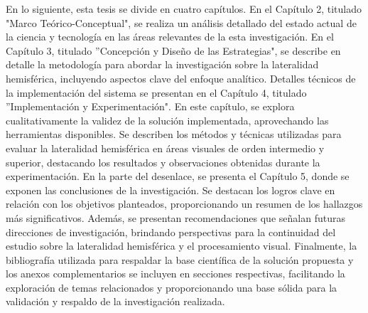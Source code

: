 	En lo siguiente, esta tesis se divide en cuatro capítulos.  En el Capítulo 2, titulado "Marco Teórico-Conceptual", se realiza un análisis detallado del estado actual de la ciencia y tecnología en las áreas relevantes de la esta investigaci\'on. En el Capítulo 3, titulado ''Concepción y Diseño de las Estrategias", se describe en detalle la metodología para abordar la investigación sobre la lateralidad hemisférica, incluyendo aspectos clave del enfoque analítico. Detalles técnicos de la implementación del sistema se presentan en el Capítulo 4, titulado ''Implementación y Experimentación". En este capítulo, se explora cualitativamente la validez de la solución implementada, aprovechando las herramientas disponibles. Se describen los métodos y técnicas utilizadas para evaluar la lateralidad hemisférica en áreas visuales de orden intermedio y superior, destacando los resultados y observaciones obtenidas durante la experimentación. En la parte del desenlace, se presenta el Capítulo 5, donde se exponen las conclusiones de la investigación. Se destacan los logros clave en relación con los objetivos planteados, proporcionando un resumen de los hallazgos más significativos. Además, se presentan recomendaciones que señalan futuras direcciones de investigación, brindando perspectivas para la continuidad del estudio sobre la lateralidad hemisférica y el procesamiento visual. Finalmente, la bibliografía utilizada para respaldar la base científica de la solución propuesta y los anexos complementarios se incluyen en secciones respectivas, facilitando la exploración de temas relacionados y proporcionando una base sólida para la validación y respaldo de la investigación realizada.
	


